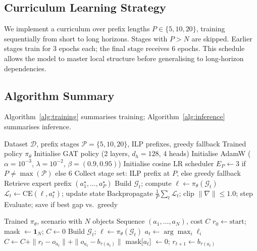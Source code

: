 \documentclass[conference]{IEEEtran}
\begin{document}
\subsection{Curriculum Learning Strategy}

We implement a curriculum over prefix lengths $P \in \{5, 10, 20\}$, training sequentially from short to long horizons. Stages with $P > N$ are skipped. Earlier stages train for 3 epochs each; the final stage receives 6 epochs. This schedule allows the model to master local structure before generalising to long-horizon dependencies.

\subsection{Algorithm Summary}

Algorithm~\ref{alg:training} summarises training; Algorithm~\ref{alg:inference} summarises inference.

\begin{algorithm}[htbp]
\caption{Curriculum-Based Imitation Learning}
\label{alg:training}
\begin{algorithmic}[1]
\REQUIRE Dataset $\mathcal{D}$, prefix stages $\mathcal{P}{=}\{5,10,20\}$, ILP prefixes, greedy fallback
\ENSURE Trained policy $\pi_\theta$
\STATE Initialise GAT policy (2 layers, $d_h{=}128$, 4 heads)
\STATE Initialise AdamW ($\alpha{=}10^{-3}$, $\lambda{=}10^{-2}$, $\beta{=}(0.9, 0.95)$)
\STATE Initialise cosine LR scheduler
    \STATE $E_P \leftarrow 3$ if $P \neq \max(\mathcal{P})$ else $6$
    \STATE Collect stage set: ILP prefix at $P$, else greedy fallback
            \STATE Retrieve expert prefix $(a_1^\star, \dots, a_P^\star)$
                \STATE Build $\mathcal{G}_t$; compute $\ell \leftarrow \pi_\theta(\mathcal{G}_t)$
                \STATE $\mathcal{L}_t \leftarrow \text{CE}(\ell, a_t^\star)$; update state
            \ENDFOR
            \STATE Backpropagate $\frac{1}{P}\sum_t \mathcal{L}_t$; clip $\|\nabla\|{\le}1.0$; step
        \ENDFOR
        \STATE Evaluate; save if best gap vs.\ greedy
    \ENDFOR
\ENDFOR
\end{algorithmic}
\end{algorithm}

\begin{algorithm}[htbp]
\caption{Greedy Inference Rollout}
\label{alg:inference}
\begin{algorithmic}[1]
\REQUIRE Trained $\pi_\theta$, scenario with $N$ objects
\ENSURE Sequence $(a_1, \dots, a_N)$, cost $C$
\STATE $r_0 \leftarrow \text{start}$; mask $\leftarrow \mathbf{1}_N$; $C \leftarrow 0$
    \STATE Build $\mathcal{G}_t$; $\ell \leftarrow \pi_\theta(\mathcal{G}_t)$
    \STATE $a_t \leftarrow \arg\max_i \ell_i$
    \STATE $C \leftarrow C + \|r_t - o_{a_t}\| + \|o_{a_t} - b_{\tau(a_t)}\|$
    \STATE mask[$a_t$] $\leftarrow 0$; $r_{t+1} \leftarrow b_{\tau(a_t)}$
\ENDFOR
\end{algorithmic}
\end{algorithm}
\end{document}
